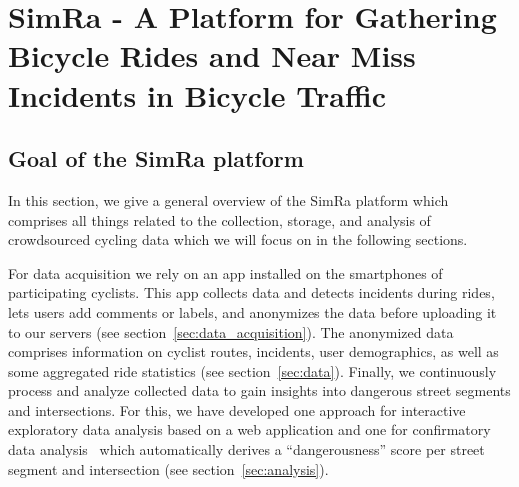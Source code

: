 \section{SimRa - A Platform for Gathering Bicycle Rides and Near Miss Incidents in Bicycle Traffic}
\label{sec:simra}

\subsection{Goal of the SimRa platform}
\label{subsec:simra}
In this section, we give a general overview of the SimRa platform which comprises all things related to the collection, storage, and analysis of crowdsourced cycling data which we will focus on in the following sections.

For data acquisition we rely on an app installed on the smartphones of participating cyclists.
This app collects data and detects incidents during rides, lets users add comments or labels, and anonymizes the data before uploading it to our servers (see section~\ref{sec:data_acquisition}).
The anonymized data comprises information on cyclist routes, incidents, user demographics, as well as some aggregated ride statistics (see section~\ref{sec:data}).
Finally, we continuously process and analyze collected data to gain insights into dangerous street segments and intersections.
For this, we have developed one approach for interactive exploratory data analysis based on a web application and one for confirmatory data analysis~\cite{bermbach2017cloud} which automatically derives a ``dangerousness'' score per street segment and intersection (see section~\ref{sec:analysis}).

